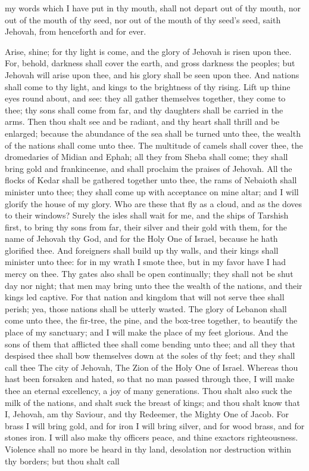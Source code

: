 my words which I have put in thy mouth, shall not depart out of thy mouth, nor out of the mouth of thy seed, nor out of the mouth of thy seed’s seed, saith Jehovah, from henceforth and for ever. 

Arise, shine; for thy light is come, and the glory of Jehovah is risen upon thee. For, behold, darkness shall cover the earth, and gross darkness the peoples; but Jehovah will arise upon thee, and his glory shall be seen upon thee. And nations shall come to thy light, and kings to the brightness of thy rising.  Lift up thine eyes round about, and see: they all gather themselves together, they come to thee; thy sons shall come from far, and thy daughters shall be carried in the arms. Then thou shalt see and be radiant, and thy heart shall thrill and be enlarged; because the abundance of the sea shall be turned unto thee, the wealth of the nations shall come unto thee. The multitude of camels shall cover thee, the dromedaries of Midian and Ephah; all they from Sheba shall come; they shall bring gold and frankincense, and shall proclaim the praises of Jehovah. All the flocks of Kedar shall be gathered together unto thee, the rams of Nebaioth shall minister unto thee; they shall come up with acceptance on mine altar; and I will glorify the house of my glory. Who are these that fly as a cloud, and as the doves to their windows? Surely the isles shall wait for me, and the ships of Tarshish first, to bring thy sons from far, their silver and their gold with them, for the name of Jehovah thy God, and for the Holy One of Israel, because he hath glorified thee.  And foreigners shall build up thy walls, and their kings shall minister unto thee: for in my wrath I smote thee, but in my favor have I had mercy on thee. Thy gates also shall be open continually; they shall not be shut day nor night; that men may bring unto thee the wealth of the nations, and their kings led captive. For that nation and kingdom that will not serve thee shall perish; yea, those nations shall be utterly wasted. The glory of Lebanon shall come unto thee, the fir-tree, the pine, and the box-tree together, to beautify the place of my sanctuary; and I will make the place of my feet glorious. And the sons of them that afflicted thee shall come bending unto thee; and all they that despised thee shall bow themselves down at the soles of thy feet; and they shall call thee The city of Jehovah, The Zion of the Holy One of Israel.  Whereas thou hast been forsaken and hated, so that no man passed through thee, I will make thee an eternal excellency, a joy of many generations. Thou shalt also suck the milk of the nations, and shalt suck the breast of kings; and thou shalt know that I, Jehovah, am thy Saviour, and thy Redeemer, the Mighty One of Jacob. For brass I will bring gold, and for iron I will bring silver, and for wood brass, and for stones iron. I will also make thy officers peace, and thine exactors righteousness. Violence shall no more be heard in thy land, desolation nor destruction within thy borders; but thou shalt call 